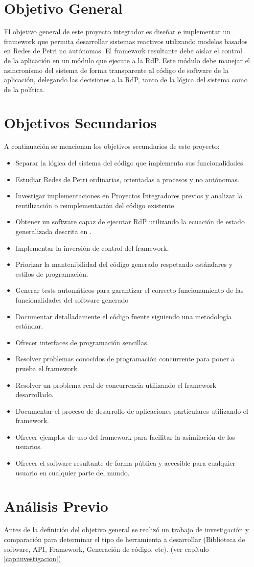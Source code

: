\section{Objetivo General}
El objetivo general de este proyecto integrador es diseñar e implementar un
framework que permita desarrollar sistemas reactivos utilizando modelos basados
en Redes de Petri no autónomas. El framework resultante debe aislar el control
de la aplicación en un módulo que ejecute a la RdP. Este módulo debe manejar el
asincronismo del sistema de forma transparente al código de software de la
aplicación, delegando las decisiones a la RdP, tanto de la lógica del sistema
como de la política.


\section{Objetivos Secundarios}
\label{sec:objetivos_secundarios}
A continuación se mencionan los objetivos secundarios de este proyecto:
\begin{itemize}
  \item Separar la lógica del sistema del código que implementa sus
  funcionalidades.
  \item Estudiar Redes de Petri ordinarias, orientadas a procesos y no
  autónomas.
  \item Investigar implementaciones en Proyectos Integradores previos y analizar
  la reutilización o reimplementación del código existente.
  \item Obtener un software capaz de ejecutar RdP utilizando la ecuación de
  estado generalizada descrita en \cite{Ecuacion_generalizada_LAC}.
  \item Implementar la inversión de control del framework.
  \item Priorizar la mantenibilidad del código generado respetando estándares y
  estilos de programación.
  \item Generar tests automáticos para garantizar el correcto funcionamiento de
  las funcionalidades del software generado
  \item Documentar detalladamente el código fuente siguiendo una metodología
  estándar.
  \item Ofrecer interfaces de programación sencillas.
  \item Resolver problemas conocidos de programación concurrente para poner a
  prueba el framework.
  \item Resolver un problema real de concurrencia utilizando el framework
  desarrollado.
  \item Documentar el proceso de desarrollo de aplicaciones particulares
  utilizando el framework.
  \item Ofrecer ejemplos de uso del framework para facilitar la asimilación de
  los usuarios.
  \item Ofrecer el software resultante de forma pública y accesible para
  cualquier usuario en cualquier parte del mundo.
\end{itemize}

\section{Análisis Previo}
Antes de la definición del objetivo general se realizó un trabajo de
investigación y comparación para determinar el tipo de herramienta a
desarrollar (Biblioteca de software, API, Framework, Generación de código,
etc). (ver capítulo \ref{cap:investigacion})